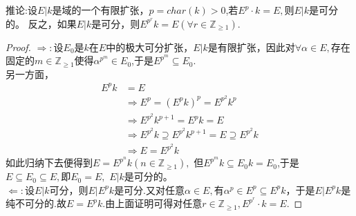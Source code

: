 \documentclass[UTF8]{article}
\begin{document}
推论:设$E|k$是域的一个有限扩张，$p=char(k)>0$,若$E^{p}\cdot k=E,$则$E|k$是可分的。
反之，如果$E|k$是可分，则$E^{p^{r}}k=E(\forall r\in \mathbb{Z}_{\geq 1}).$\\
\begin{proof}
	
	$\Rightarrow:$设$E_{0}$是$k$在$E$中的极大可分扩张，$E|k$是有限扩张，因此对$\forall \alpha \in E,$存在固定的$m\in \mathbb{Z}_{\geq 1}$使得$\alpha^{p^{m}}\in E_{0}$,于是$E^{p^{m}}\subseteq E_{0}.$\\
	
	另一方面，
	\[
	\begin{split}
	E^{p}k&=E\\
	&\Rightarrow E^{p}=(E^{p}k)^{p}=E^{p^{2}}k^{p}\\
	&\Rightarrow E^{p^{2}}k^{p+1}=E^{p}k=E\\
	&\Rightarrow E^{p^{2}}k\supseteq E^{p^{2}}k^{p+1}=E\supseteq E^{p^{2}}k\\
	&\Rightarrow E=E^{p^{2}}k
	\end{split}
	\]
	如此归纳下去便得到$E=E^{p^{n}}k(n\in \mathbb{Z}_{\geq 1}),$
	但$E^{p^{m}}k\subseteq E_{0}k=E_{0}$,于是$E\subseteq E_{0}\subseteq E,$即$E_{0}=E,$ $E|k$是可分的。\\
	$\Leftarrow:$设$E|k$可分，则$E|E^{p}k$是可分.又对任意$\alpha\in E,$有$\alpha^{p}\in E^{p}\subseteq E^{p}k$，于是$E|E^{p}k$是纯不可分的.故$E=E^{p}k.$由上面证明可得对任意$r\in \mathbb{Z}_{\geq 1},E^{p^{r}}\cdot k=E.$
\end{proof}
\end{document}
